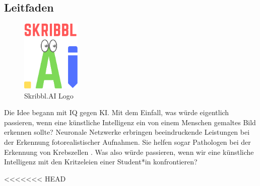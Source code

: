 \documentclass[11pt]{article}
\begin{document}
\subsection{Leitfaden}
\begin{figure}
\centering
\includegraphics[width=0.25\textwidth]{images/logo_skribbl.png}
\caption{\label{fig:skribblLogo}Skribbl.AI Logo}
\end{figure}
Die Idee begann mit IQ gegen KI. Mit dem Einfall, was würde eigentlich passieren, wenn eine künstliche Intelligenz ein von einem Menschen gemaltes Bild  erkennen sollte? Neuronale Netzwerke erbringen beeindruckende Leistungen bei der Erkennung fotorealistischer Aufnahmen. Sie helfen sogar Pathologen bei der Erkennung von Krebszellen \parencite{ElizabethDougherty2018}. Was also würde  passieren, wenn wir eine künstliche Intelligenz mit den Kritzeleien einer Student*in konfrontieren?

<<<<<<< HEAD

 
\end{document}
